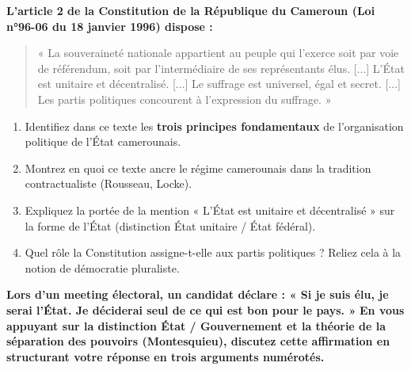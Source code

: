 \documentclass[11pt]{article}
\newcommand{\cle}[1]{{\popxbold\color{popdark}#1}}
\begin{document}
\begin{exercice}
\textbf{L'article 2 de la Constitution de la République du Cameroun (Loi n°96-06 du 18 janvier 1996) dispose :}
\begin{quote}
« La souveraineté nationale appartient au peuple qui l'exerce soit par voie de référendum, soit par l'intermédiaire de ses représentants élus. [...] L'État est unitaire et décentralisé. [...] Le suffrage est universel, égal et secret. [...] Les partis politiques concourent à l'expression du suffrage. »
\end{quote}
\begin{enumerate}
    \item Identifiez dans ce texte les \textbf{trois principes fondamentaux} de l'organisation politique de l'État camerounais.
    \item Montrez en quoi ce texte ancre le régime camerounais dans la tradition \cle{contractualiste} (Rousseau, Locke).
    \item Expliquez la portée de la mention « L'État est unitaire et décentralisé » sur la forme de l'État (distinction État unitaire / État fédéral).
    \item Quel rôle la Constitution assigne-t-elle aux \cle{partis politiques} ? Reliez cela à la notion de \cle{démocratie pluraliste}.
\end{enumerate}
\end{exercice}

\begin{exercice}
\textbf{Lors d'un meeting électoral, un candidat déclare : « Si je suis élu, je serai l'État. Je déciderai seul de ce qui est bon pour le pays. »}
\textbf{En vous appuyant sur la distinction \cle{État / Gouvernement} et la théorie de la \cle{séparation des pouvoirs} (Montesquieu), discutez cette affirmation en structurant votre réponse en trois arguments numérotés.}
\end{exercice}
\end{document}
